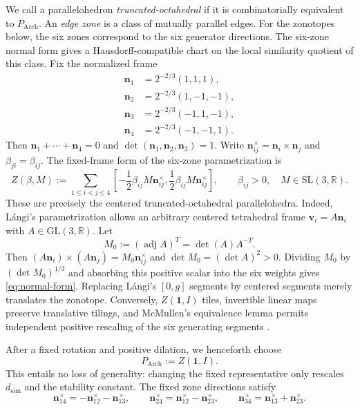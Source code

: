 \documentclass[11pt]{article}
\newcommand{\R}{\mathbb R}
\newcommand{\Arch}{P_{\mathrm{Arch}}}
\newcommand{\mb}[1]{\mathbf{#1}}
\theoremstyle{remark}
\begin{document}
We call a parallelohedron \emph{truncated-octahedral} if it is combinatorially equivalent to $\Arch$.  An \emph{edge zone} is a class of mutually parallel edges. 
For the zonotopes below, the six zones correspond to the six generator directions.  
The six-zone normal form gives a Hausdorff-compatible chart on the local similarity quotient of this class.
Fix the normalized frame
\begin{equation}\label{eq:tetrahedron}
\begin{aligned}
 \mb n_1&=2^{-2/3}(1,1,1), \\
 \mb n_2&=2^{-2/3}(1,-1,-1),\\
 \mb n_3&=2^{-2/3}(-1,1,-1),\\
 \mb n_4&=2^{-2/3}(-1,-1,1).
\end{aligned}
\end{equation}
Then $\mb n_1+\cdots+\mb n_4=0$ and
$\det(\mb n_1,\mb n_2,\mb n_3)=1$.  Write
$\mb n_{ij}^{\times}=\mb n_i\times\mb n_j$ and $\beta_{ji}=\beta_{ij}$.
The fixed-frame form of the
six-zone parametrization is
\begin{equation}\label{eq:normal-form}
 Z(\beta,M):=\sum_{1\leq i<j\leq4}
 \left[-\frac12\beta_{ij}M\mb n_{ij}^{\times},
             \frac12\beta_{ij}M\mb n_{ij}^{\times}\right],
 \qquad \beta_{ij}>0,\quad M\in\mathrm{SL}(3,\R).
\end{equation}
These are precisely the centered truncated-octahedral parallelohedra.  Indeed, L\'angi's
parametrization \cite{Langi2022} allows an arbitrary centered tetrahedral frame
$\mb v_i=A\mb n_i$ with
$A\in\mathrm{GL}(3,\R)$.  
Let
\[
 M_0:=(\operatorname{adj}A)^T=\det(A)A^{-T}.
\]
Then $(A\mb n_i)\times(A\mb n_j)=M_0\mb n_{ij}^{\times}$ and
$\det M_0=(\det A)^2>0$.  
Dividing $M_0$ by $(\det M_0)^{1/3}$ and absorbing this positive scalar into the six weights gives \eqref{eq:normal-form}. 
Replacing L\'angi's $[0,g]$ segments by centered segments merely translates the zonotope.  
Conversely,
$Z(\mb{1},I)$ tiles, invertible linear maps preserve translative tilings, and McMullen's
equivalence lemma permits independent positive rescaling of the six generating segments
\cite[Lemma~1]{McMullen1975}.

After a fixed rotation and positive dilation, we henceforth choose
\[
 \Arch:=Z(\mb{1},I).
\]
This entails no loss of generality: changing the fixed representative only rescales
$d_{\mathrm{sim}}$ and the stability constant.
The fixed zone directions satisfy
\begin{equation}\label{eq:line-relations}
 \mb n_{14}^{\times}=-\mb n_{12}^{\times}-\mb n_{13}^{\times},\qquad
 \mb n_{24}^{\times}=\mb n_{12}^{\times}-\mb n_{23}^{\times},\qquad
 \mb n_{34}^{\times}=\mb n_{13}^{\times}+\mb n_{23}^{\times}.
\end{equation}
\end{document}
